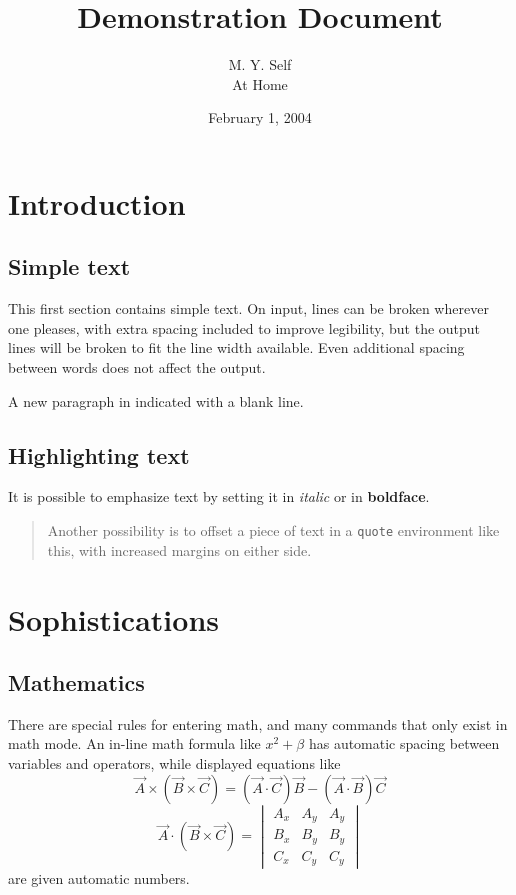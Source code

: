 \documentclass[a4paper,12pt]{article}
\title{Demonstration Document}
\author{M. Y. Self\\
        At Home}
\date{February 1, 2004}
\begin{document}
\maketitle

\section{Introduction}

\subsection{Simple text}
This first section contains simple text.
On input, lines can be broken wherever one pleases,
  with extra spacing included to improve legibility,
  but the output lines will be broken to fit the
  line width available. Even additional    spacing
     between    words   does   not    affect
        the output.

A new paragraph in indicated with a blank line.

\subsection{Highlighting text}

It is possible to emphasize text by setting it in
\emph{italic} or in \textbf{boldface}.

\begin{quote}
Another possibility is to offset a piece of text in a
\texttt{quote} environment like this, with increased
margins on either side.
\end{quote}

\section{Sophistications}

\subsection{Mathematics}

There are special rules for entering math, and many
commands that only exist in math mode. An in-line math
formula like $x^2+\beta$ has automatic spacing between
variables and operators, while displayed equations like
\begin{equation}
  \vec{A} \times (\vec{B}\times\vec{C}) =
  (\vec{A}\cdot\vec{C})\vec{B} -
  (\vec{A}\cdot\vec{B})\vec{C}
\end{equation}
\begin{equation}
  \vec{A}\cdot(\vec{B}\times\vec{C}) =
  \begin{vmatrix}
    A_x & A_y & A_y \\
    B_x & B_y & B_y \\
    C_x & C_y & C_y
  \end{vmatrix}
\end{equation}
are given automatic numbers.
\end{document}
